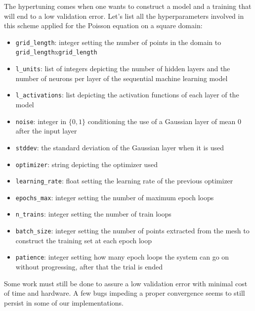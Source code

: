 \documentclass{article}
\theoremstyle{definition}
\theoremstyle{property}
\theoremstyle{remark}
\begin{document}
	The hypertuning comes when one wants to construct a model and a training that will end to a low validation error. Let's list all the hyperparameters involved in this scheme applied for the Poisson equation on a square domain:
	\begin{itemize}
		\item \texttt{grid\_length}: integer setting the number of points in the domain to \texttt{grid\_length}x\texttt{grid\_length}
		\item \texttt{l\_units}: list of integers depicting the number of hidden layers and the number of neurons per layer of the sequential machine learning model
		\item \texttt{l\_activations}: list depicting the activation functions of each layer of the model
		\item \texttt{noise}: integer in $\{0,1\}$ conditioning the use of a Gaussian layer of mean $0$ after the input layer
		\item \texttt{stddev}: the standard deviation of the Gaussian layer when it is used
		\item \texttt{optimizer}: string depicting the optimizer used
		\item \texttt{learning\_rate}: float setting the learning rate of the previous optimizer
		\item \texttt{epochs\_max}: integer setting the number of maximum epoch loops
		\item \texttt{n\_trains}: integer setting the number of train loops
		\item \texttt{batch\_size}: integer setting the number of points extracted from the mesh to construct the training set at each epoch loop
		\item \texttt{patience}: integer setting how many epoch loops the system can go on without progressing, after that the trial is ended
	\end{itemize}
	
	Some work must still be done to assure a low validation error with minimal cost of time and hardware. A few bugs impeding a proper convergence seems to still persist in some of our implementations.
	
	
	
\end{document}
